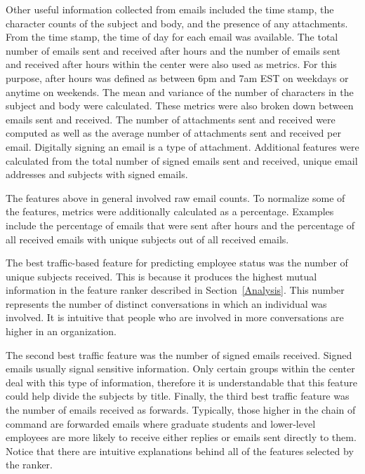 \documentclass[10pt,twocolumn,conference]{IEEEtran}
\begin{document}
Other useful information collected from emails included the time stamp, the character counts of the subject and body, and the presence of any attachments.
From the time stamp, the time of day for each email was available.
The total number of emails sent and received after hours and the number of emails sent and received after hours within the center were also used as metrics.
For this purpose, after hours was defined as between 6pm and 7am EST on weekdays or anytime on weekends.
The mean and variance of the number of characters in the subject and body were calculated.
These metrics were also broken down between emails sent and received.
The number of attachments sent and received were computed as well as the average number of attachments sent and received per email.
Digitally signing an email is a type of attachment.
Additional features were calculated from the total number of signed emails sent and received, unique email addresses and subjects with signed emails.

The features above in general involved raw email counts.
To normalize some of the features, metrics were additionally calculated as a percentage.
Examples include the percentage of emails that were sent after hours and the percentage of all received emails with unique subjects out of all received emails.

The best traffic-based feature for predicting employee status was the number of unique subjects received.
This is because it produces the highest mutual information in the feature ranker described in Section~\ref{Analysis}.
This number represents the number of distinct conversations in which an individual was involved.
It is intuitive that people who are involved in more conversations are higher in an organization.

The second best traffic feature was the number of signed emails received.
Signed emails usually signal sensitive information.
Only certain groups within the center deal with this type of information, therefore it is understandable that this feature could help divide the subjects by title.
Finally, the third best traffic feature was the number of emails received as forwards.
Typically, those higher in the chain of command are forwarded emails where graduate students and lower-level employees are more likely to receive either replies or emails sent directly to them.
Notice that there are intuitive explanations behind all of the features selected by the ranker.
\end{document}

